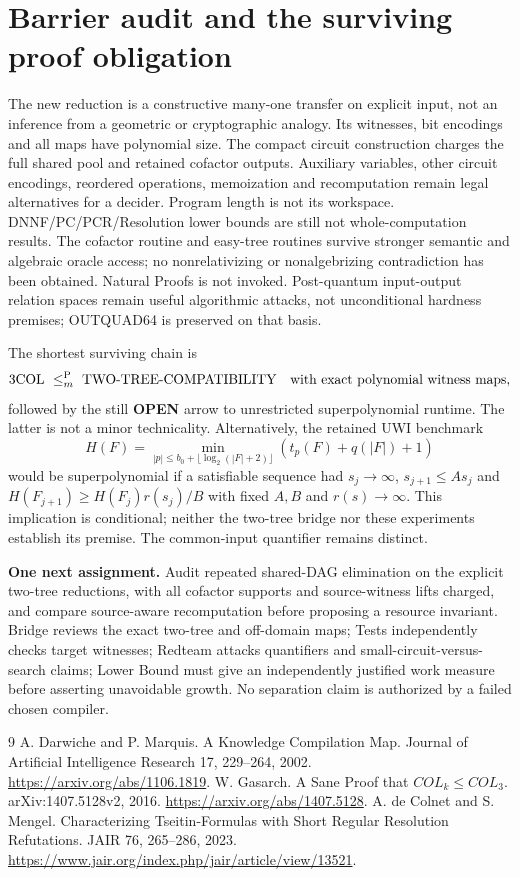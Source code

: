 \documentclass[11pt]{article}
\begin{document}
\section{Barrier audit and the surviving proof obligation}
The new reduction is a constructive many-one transfer on explicit input,
not an inference from a geometric or cryptographic analogy. Its witnesses,
bit encodings and all maps have polynomial size. The compact circuit
construction charges the full shared pool and retained cofactor outputs.
Auxiliary variables, other circuit encodings, reordered operations, memoization
and recomputation remain legal alternatives for a decider. Program length
is not its workspace. DNNF/PC/PCR/Resolution lower bounds are still not
whole-computation results. The cofactor routine and easy-tree routines survive
stronger semantic and algebraic oracle access; no nonrelativizing or
nonalgebrizing contradiction has been obtained. Natural Proofs is not invoked.
Post-quantum input-output relation spaces remain useful algorithmic attacks,
not unconditional hardness premises; OUTQUAD64 is preserved on that basis.

The shortest surviving chain is
\[
 \mathrm{3COL}\ \le_m^{\rm P}\ \mathrm{TWO\mbox{-}TREE\mbox{-}COMPATIBILITY}
 \quad\text{with exact polynomial witness maps},
\]
followed by the still \textbf{OPEN} arrow to unrestricted superpolynomial
runtime. The latter is not a minor technicality. Alternatively, the retained
UWI benchmark
\[
 H(F)=\min_{|p|\le b_0+\lfloor\log_2(|F|+2)\rfloor}
                   (t_p(F)+q(|F|)+1)
\]
would be superpolynomial if a satisfiable sequence had
$s_j\to\infty$, $s_{j+1}\le As_j$ and
$H(F_{j+1})\ge H(F_j)r(s_j)/B$ with fixed $A,B$ and $r(s)\to\infty$.
This implication is conditional; neither the two-tree bridge nor these
experiments establish its premise. The common-input quantifier remains distinct.

\textbf{One next assignment.} Audit repeated shared-DAG elimination on the
explicit two-tree reductions, with all cofactor supports and source-witness
lifts charged, and compare source-aware recomputation before proposing a
resource invariant. Bridge reviews the exact two-tree and off-domain maps;
Tests independently checks target witnesses; Redteam attacks quantifiers and
small-circuit-versus-search claims; Lower Bound must give an independently
justified work measure before asserting unavoidable growth. No separation
claim is authorized by a failed chosen compiler.

\begin{thebibliography}{9}
 A. Darwiche and P. Marquis. A Knowledge Compilation Map.
Journal of Artificial Intelligence Research 17, 229--264, 2002.
\url{https://arxiv.org/abs/1106.1819}.
 W. Gasarch. A Sane Proof that $COL_k\le COL_3$.
arXiv:1407.5128v2, 2016. \url{https://arxiv.org/abs/1407.5128}.
 A. de Colnet and S. Mengel. Characterizing Tseitin-Formulas
with Short Regular Resolution Refutations. JAIR 76, 265--286, 2023.
\url{https://www.jair.org/index.php/jair/article/view/13521}.
\end{thebibliography}
\end{document}
